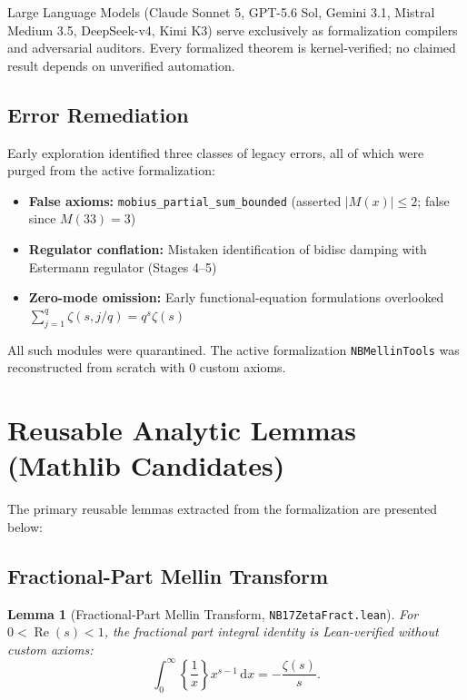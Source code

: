 \documentclass[11pt,a4paper]{article}
\theoremstyle{plain}
\newtheorem{lemma}[theorem]{Lemma}
\theoremstyle{definition}
\theoremstyle{remark}
\newcommand{\diff}{\mathrm{d}}
\DeclareMathOperator{\RePart}{Re}
\renewcommand{\Re}{\RePart}
\begin{document}
Large Language Models (Claude Sonnet 5, GPT-5.6 Sol, Gemini 3.1, Mistral Medium 3.5, DeepSeek-v4, Kimi K3) serve exclusively as formalization compilers and adversarial auditors. Every formalized theorem is kernel-verified; no claimed result depends on unverified automation.

\subsection{Error Remediation}

Early exploration identified three classes of legacy errors, all of which were purged from the active formalization:

\begin{itemize}[leftmargin=2em]
  \item \textbf{False axioms:} \texttt{mobius\_partial\_sum\_bounded} (asserted $|M(x)| \le 2$; false since $M(33)=3$)
  \item \textbf{Regulator conflation:} Mistaken identification of bidisc damping with Estermann regulator (Stages 4--5)
  \item \textbf{Zero-mode omission:} Early functional-equation formulations overlooked $\sum_{j=1}^q \zeta(s, j/q) = q^s \zeta(s)$
\end{itemize}

All such modules were quarantined. The active formalization \texttt{NBMellinTools} was reconstructed from scratch with 0 custom axioms.

\section{Reusable Analytic Lemmas (Mathlib Candidates)}
\label{sec:lemmas}

The primary reusable lemmas extracted from the formalization are presented below:

\subsection{Fractional-Part Mellin Transform}

\begin{lemma}[Fractional-Part Mellin Transform, \texttt{NB17ZetaFract.lean}]
For $0 < \Re(s) < 1$, the fractional part integral identity is Lean-verified without custom axioms:
\[
\int_{0}^{\infty} \left\{ \frac{1}{x} \right\} x^{s-1} \,\diff x = -\frac{\zeta(s)}{s}.
\]
\end{lemma}
\end{document}
